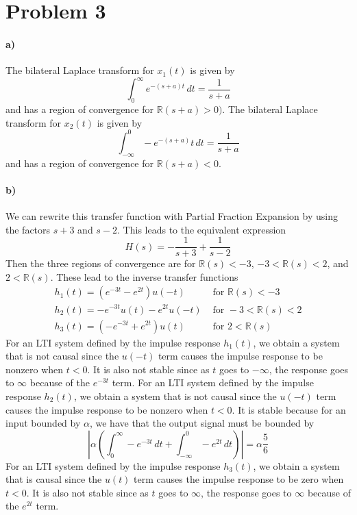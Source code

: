 \documentclass[12pt]{article}
\begin{document}
\section*{Problem 3}

\paragraph{a)}

The bilateral Laplace transform for \(x_1(t)\) is given by
\[\int_0^\infty e^{-(s+a)t}\, dt = \frac{1}{s+a}\]
and has a region of convergence for \(\mathbb{R}(s+a)>0)\). The bilateral Laplace transform for
\(x_2(t)\) is given by
\[\int_{-\infty}^0 -e^{-(s+a)}t\, dt = \frac{1}{s+a}\]
and has a region of convergence for \(\mathbb{R}(s+a)<0\).

\paragraph{b)}

We can rewrite this transfer function with Partial Fraction Expansion by using the factors \(s+3\) and
\(s-2\). This leads to the equivalent expression
\[H(s)=-\frac{1}{s+3} + \frac{1}{s-2}\]
Then the three regions of convergence are for \(\mathbb{R}(s)<-3\),  \(-3<\mathbb{R}(s)<2\), and
\(2<\mathbb{R}(s)\). These lead to the inverse transfer functions
\begin{align*}
    h_1(t)=\left(e^{-3t}-e^{2t}\right)u(-t) & \text{ for } \mathbb{R}(s)<-3\\
    h_2(t)=-e^{-3t}u(t)-e^{2t}u(-t) & \text{ for } -3<\mathbb{R}(s)<2\\
    h_3(t)=\left(-e^{-3t}+e^{2t}\right)u(t) & \text{ for } 2<\mathbb{R}(s)
\end{align*}
For an LTI system defined by the impulse response \(h_1(t)\), we obtain a system that is not causal since
the \(u(-t)\) term causes the impulse response to be nonzero when \(t<0\). It is also not stable since as
\(t\) goes to \(-\infty\), the response goes to \(\infty\) because of the \(e^{-3t}\) term. For an LTI
system defined by the impulse response \(h_2(t)\), we obtain a system that is not causal since
the \(u(-t)\) term causes the impulse response to be nonzero when \(t<0\). It is stable because for an input
bounded by \(\alpha\), we have that the output signal must be bounded by
\[\left|\alpha \left(\int_0^\infty-e^{-3t}\,dt + \int_{-\infty}^0 -e^{2t}\,dt\right)\right| = \alpha\frac{5}{6}\]
For an LTI system defined by the impulse response \(h_3(t)\), we obtain a system that is causal since the
\(u(t)\) term causes the impulse response to be zero when \(t<0\). It is also not stable since as
\(t\) goes to \(\infty\), the response goes to \(\infty\) because of the \(e^{2t}\) term.
\end{document}
